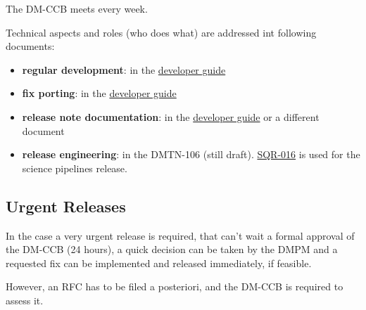 The DM-CCB meets every week.

Technical aspects and roles (who does what) are addressed int following documents:

\begin{itemize}
\item {\bf regular development}: in the \href{https://developer.lsst.io/}{developer guide}
\item {\bf fix porting}: in the \href{https://developer.lsst.io/}{developer guide}
\item {\bf release note documentation}: in the \href{https://developer.lsst.io/}{developer guide} or a different document
\item {\bf release engineering}: in the DMTN-106 (still draft). \href{https://sqr-016.lsst.io/}{SQR-016} is used for the science pipelines release.
\end{itemize}


\subsection{Urgent Releases}

In the case a very urgent release is required, that can't wait a formal approval of the DM-CCB (24 hours),
a quick decision can be taken by the \gls{DMPM} and a requested fix can be implemented and released immediately, if feasible.

However, an \gls{RFC} has to be filed a posteriori, and the DM-CCB is required to assess it.

